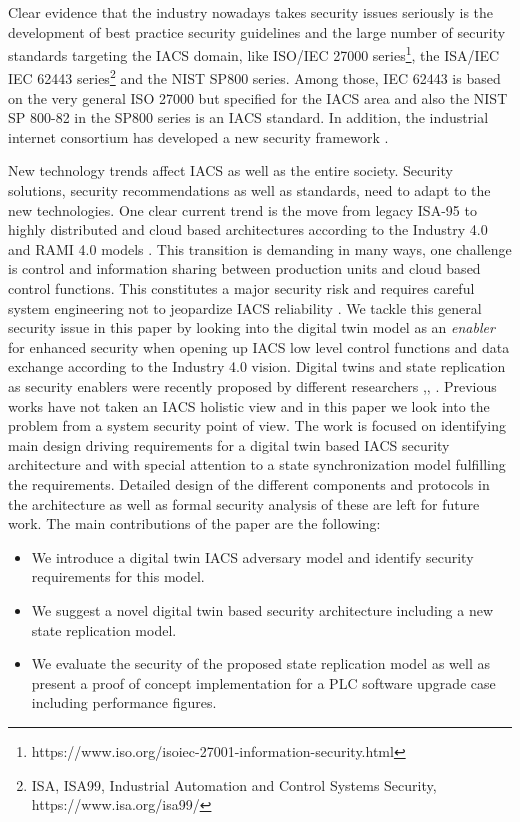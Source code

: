 Clear evidence that the industry nowadays takes security issues seriously is the development of best practice security guidelines \cite{Didier2014} and the large number of security standards targeting the IACS domain, like ISO/IEC 27000 series\footnote{https://www.iso.org/isoiec-27001-information-security.html}, the ISA/IEC IEC 62443 series\footnote{ISA, ISA99, Industrial Automation and Control Systems Security, https://www.isa.org/isa99/} and the NIST SP800 series. Among those, IEC 62443 is based on the very general ISO 27000 but specified for the IACS area and also the NIST SP 800-82 \cite{NISTICS2015} in the SP800 series is an IACS standard. In addition, the industrial internet consortium has developed a new security framework \cite{Schrecker2016}. 

New technology trends affect IACS as well as the entire society. Security solutions, security recommendations as well as standards, need to adapt to the new technologies. One clear current trend is the move from legacy ISA-95 to highly distributed and cloud based architectures according to the Industry 4.0 and RAMI 4.0 models \cite{Lee2014}. This transition is demanding in many  ways, one challenge is control and information sharing between production units and cloud based control functions. This constitutes a major security risk and requires careful system engineering not to jeopardize IACS reliability \cite{Delsing2017}. We tackle this general security issue in this paper by looking into the digital twin model as an {\it enabler} for enhanced security when opening up IACS low level control functions and data exchange according to the Industry 4.0 vision. Digital twins and state replication as security enablers were recently proposed by different researchers \cite{Bittion2018},\cite{Eckhart2018}, \cite{Eckhart2018_2}. Previous works have not taken an IACS holistic view and in this paper we look into the problem from a system security point of view. The work is focused on identifying main design driving requirements for a digital twin based IACS security architecture and with special attention to a state synchronization model fulfilling the requirements. Detailed design of the different components and protocols in the architecture as well as formal security analysis of these are left for future work. 
The main contributions of the paper are the following:
\begin{itemize}
    \item We introduce a digital twin IACS adversary model and identify security requirements for this model.
    \item We suggest a novel digital twin based security architecture including a new state replication model.
    \item We evaluate the security of the proposed state replication model as well as present a proof of concept implementation  for a PLC software upgrade case including performance figures.
\end{itemize}
